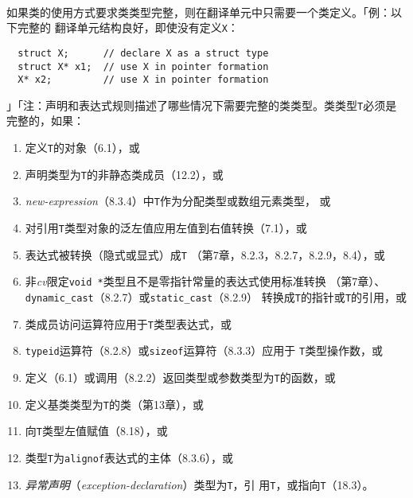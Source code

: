 \paragraph{}
如果类的使用方式要求类类型完整，则在翻译单元中只需要一个类定义。「例：以下完整的
翻译单元结构良好，即使没有定义\texttt{X}：
\begin{lstlisting}
  struct X;      // declare X as a struct type
  struct X* x1;  // use X in pointer formation
  X* x2;         // use X in pointer formation
\end{lstlisting}
」「注：声明和表达式规则描述了哪些情况下需要完整的类类型。类类型\texttt{T}必须是
完整的，如果：
\begin{enumerate}
  \item{定义\texttt{T}的对象（6.1），或}
  \item{声明类型为\texttt{T}的非静态类成员（12.2），或}
  \item{\textit{new-expression}（8.3.4）中\texttt{T}作为分配类型或数组元素类型，
    或}
  \item{对引用\texttt{T}类型对象的泛左值应用左值到右值转换（7.1），或}
  \item{表达式被转换（隐式或显式）成\texttt{T}
    （第7章，8.2.3，8.2.7，8.2.9，8.4），或}
  \item{非\textit{cv}限定\texttt{void *}类型且不是零指针常量的表达式使用标准转换
      （第7章）、\texttt{dynamic\_cast}（8.2.7）或\texttt{static\_cast}（8.2.9）
      转换成\texttt{T}的指针或\texttt{T}的引用，或}
  \item{类成员访问运算符应用于\texttt{T}类型表达式，或}
  \item{\texttt{typeid}运算符（8.2.8）或\texttt{sizeof}运算符（8.3.3）应用于
    \texttt{T}类型操作数，或}
  \item{定义（6.1）或调用（8.2.2）返回类型或参数类型为\texttt{T}的函数，或}
  \item{定义基类类型为\texttt{T}的类（第13章），或}
  \item{向\texttt{T}类型左值赋值（8.18），或}
  \item{类型\texttt{T}为\texttt{alignof}表达式的主体（8.3.6），或}
  \item{\textit{异常声明}（\textit{exception-declaration}）类型为\texttt{T}，引
    用\texttt{T}，或指向\texttt{T}（18.3）。}
\end{enumerate}

